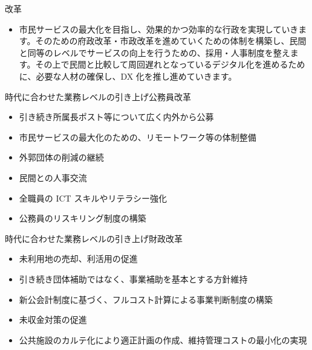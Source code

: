 \documentclass[dvipdfmx]{beamer}
\begin{document}
    \begin{frame}{改革}{}
        \begin{small}
            \begin{itemize}
                \item 市民サービスの最大化を目指し、効果的かつ効率的な行政を実現していきます。そのための府政改革・市政改革を進めていくための体制を構築し、民間と同等のレベルでサービスの向上を行うための、採用・人事制度を整えます。その上で民間と比較して周回遅れとなっているデジタル化を進めるために、必要な人材の確保し、DX 化を推し進めていきます。
            \end{itemize}
        \end{small}
    \end{frame}

    \begin{frame}{時代に合わせた業務レベルの引き上げ}{公務員改革}
        \begin{small}
            \begin{itemize}
                \setlength{\itemsep}{2mm}
                \item 引き続き所属長ポスト等について広く内外から公募
                \item 市民サービスの最大化のための、リモートワーク等の体制整備
                \item 外郭団体の削減の継続
                \item 民間との人事交流
                \item 全職員の ICT スキルやリテラシー強化
                \item 公務員のリスキリング制度の構築
            \end{itemize}
        \end{small}
    \end{frame}

    \begin{frame}{時代に合わせた業務レベルの引き上げ}{財政改革}
        \begin{small}
            \begin{itemize}
                \setlength{\itemsep}{2mm}
                \item \alert{未利用地の売却、利活用の促進}
                \item 引き続き団体補助ではなく、事業補助を基本とする方針維持
                \item 新公会計制度に基づく、フルコスト計算による事業判断制度の構築
                \item 未収金対策の促進
                \item 公共施設のカルテ化により適正計画の作成、維持管理コストの最小化の実現
            \end{itemize}
        \end{small}
    \end{frame}
    
\end{document}
